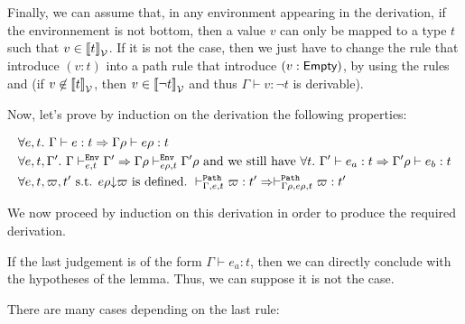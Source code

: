 \documentclass[a4paper]{article}
\theoremstyle{definition}
\begin{document}
        Finally, we can assume that, in any environment appearing in the derivation, if the environnement is not bottom,
        then a value $v$ can only be mapped to a type $t$ such that $v\in{\llbracket t \rrbracket}_{\mathcal{V}}$. If it is not the case, then we just have to change the
         rule that introduce $(v:t)$ into a path rule that introduce $(v:\textsf{Empty})$,
        by using the rules  and  (if $v\not\in{\llbracket t \rrbracket}_{\mathcal{V}}$, then $v\in{\llbracket \neg t \rrbracket}_{\mathcal{V}}$
        and thus $\Gamma \vdash v:\neg t$ is derivable).

        Now, let's prove by induction on the derivation the following properties:

        \begin{align*}
          &\forall e,t.\ \Gamma \vdash e:t \Rightarrow \Gamma\rho \vdash e\rho:t\\
          &\forall e,t,\Gamma'.\ \Gamma \vdash^{\texttt{Env}}_{e,t} \Gamma' \Rightarrow \Gamma\rho \vdash^{\texttt{Env}}_{e\rho,t} {\Gamma'}\rho
          \text{ and we still have } \forall t.\ \Gamma' \vdash e_a : t \Rightarrow \Gamma'\rho \vdash e_b:t\\
          &\forall e,t,\varpi,t' \text{ s.t. $e\rho{\downarrow}\varpi$ is defined}.\ \vdash^{\texttt{Path}}_{\Gamma,e,t} \varpi:t' \Rightarrow \vdash^{\texttt{Path}}_{\Gamma\rho,e\rho,t} \varpi:t'
        \end{align*}

        We now proceed by induction on this derivation in order to produce the required derivation.
        
        If the last judgement is of the form $\Gamma \vdash e_a: t$, then we can directly conclude with the hypotheses of the lemma.
        Thus, we can suppose it is not the case.

        There are many cases depending on the last rule:
\end{document}

